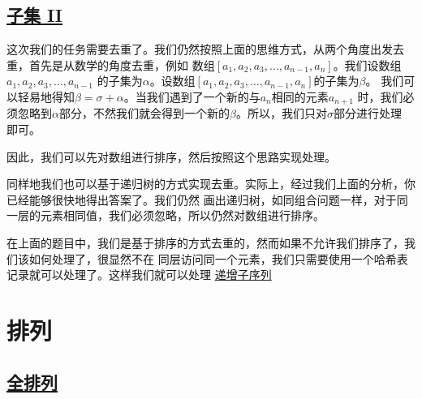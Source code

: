 \documentclass[../../main.tex]{subfiles}
\begin{document}


\subsection{\href{https://leetcode.cn/problems/subsets-ii/}{子集 II}}

这次我们的任务需要去重了。我们仍然按照上面的思维方式，从两个角度出发去重，首先是从数学的角度去重，例如
数组$[a_{1}, a_{2}, a_{3}, \dots ,a_{n - 1}, a_{n}]$。我们设数组$a_{1}, a_{2}, a_{3}, \dots ,a_{n - 1}$
的子集为$\alpha$。设数组$[a_{1}, a_{2}, a_{3}, \dots ,a_{n - 1}, a_{n}]$的子集为$\beta$。
我们可以轻易地得知$\beta = \sigma + \alpha$。当我们遇到了一个新的与$a_{n}$相同的元素$a_{n + 1}$
时，我们必须忽略到$\alpha$部分，不然我们就会得到一个新的$\beta$。所以，我们只对$\sigma$部分进行处理
即可。

因此，我们可以先对数组进行排序，然后按照这个思路实现处理。



同样地我们也可以基于递归树的方式实现去重。实际上，经过我们上面的分析，你已经能够很快地得出答案了。我们仍然
画出递归树，如同组合问题一样，对于同一层的元素相同值，我们必须忽略，所以仍然对数组进行排序。



\begin{kaobox}[title=类似题目]
  在上面的题目中，我们是基于排序的方式去重的，然而如果不允许我们排序了，我们该如何处理了，很显然不在
  同层访问同一个元素，我们只需要使用一个哈希表记录就可以处理了。这样我们就可以处理
  \href{https://leetcode.cn/problems/non-decreasing-subsequences/}{递增子序列}
\end{kaobox}

\section{排列}

\subsection{\href{https://leetcode.cn/problems/permutations/}{全排列}}
\end{document}
